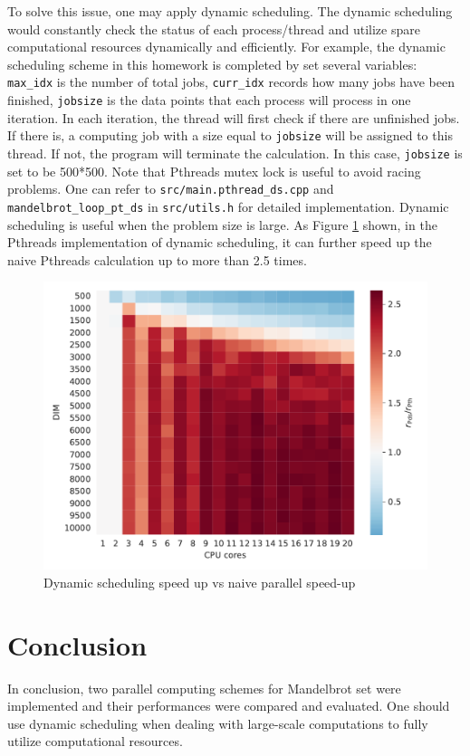 \documentclass[twoside,12pt]{article}
\theoremstyle{definition}
\theoremstyle{remark}
\begin{document}
To solve this issue, one may apply dynamic scheduling.
The dynamic scheduling would constantly check the status of each process/thread
and utilize spare computational resources dynamically and efficiently.
For example, the dynamic scheduling scheme in this homework is completed by
set several variables: \lstinline|max_idx| is the number of total jobs,
\lstinline|curr_idx| records how many jobs have been finished, 
\lstinline|jobsize| is the data points that each process will process in 
one iteration.
In each iteration, the thread will first check if there are unfinished
jobs. If there is, a computing job with a size equal to \lstinline|jobsize|
will be assigned to this thread.
If not, the program will terminate the calculation.
In this case, \lstinline|jobsize| is set to be 500*500.
Note that Pthreads mutex lock is useful to avoid racing problems.
One can refer to \lstinline|src/main.pthread_ds.cpp| and
\lstinline|mandelbrot_loop_pt_ds| in \lstinline|src/utils.h| for detailed implementation.
Dynamic scheduling is useful when the problem size is large.
As Figure \ref{fig:ds} shown, in the Pthreads implementation of dynamic
scheduling, it can further speed up the naive Pthreads
calculation up to more than 2.5 times.

\begin{figure}[h!]
    \centering
    \includegraphics[width=\textwidth]{../analysis/pds2pth.pdf}
    \caption{Dynamic scheduling speed up vs naive parallel speed-up}
    \label{fig:ds}
\end{figure}




\section{Conclusion}
In conclusion, two parallel computing schemes for Mandelbrot set were implemented and
their performances were compared and evaluated.
One should use dynamic scheduling when dealing with large-scale computations
to fully utilize computational resources.
\end{document}
